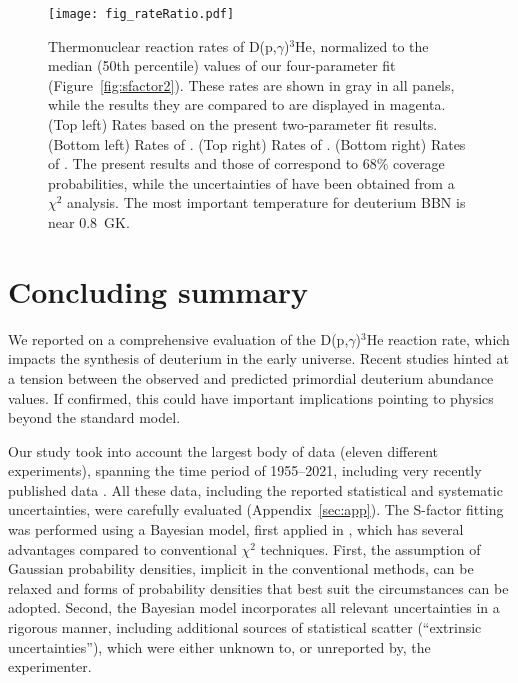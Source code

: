 \documentclass[twocolumn]{aastex63}
\begin{document}
%
\begin{figure*}
\texttt{[image: fig\_rateRatio.pdf]}
\caption{Thermonuclear reaction rates of D(p,$\gamma$)$^3$He, normalized to the median (50th percentile) values of our four-parameter fit (Figure~\ref{fig:sfactor2}). These rates are shown in gray in all panels, while the results they are compared to are displayed in magenta. (Top left) Rates based on the present two-parameter fit results. (Bottom left) Rates of \citet{iliadis16}. (Top right) Rates of \citet{Mossa20}. (Bottom right) Rates of \citet{Pis21}. The present results and those of \citet{iliadis16} correspond to 68\% coverage probabilities, while the uncertainties of \citet{Mossa20,Pis21} have been obtained from a $\chi^2$ analysis. The most important temperature for deuterium BBN is near 0.8~GK.}
\label{fig:rates}
\end{figure*}


\section{Concluding summary} 
\label{sec:summary}
We reported on a comprehensive evaluation of the D(p,$\gamma$)$^3$He reaction rate, which impacts the synthesis of deuterium in the early universe. Recent studies \citep{Coc15,Pitrou2018,IC20} hinted at a tension between the observed and predicted primordial deuterium abundance values. If confirmed, this could have important implications pointing to physics beyond the standard model.

Our study took into account the largest body of data (eleven different experiments), spanning the time period of 1955--2021, including very recently published data \citep{Tisma:2019ug,Mossa20,Turkat21}. All these data, including the reported statistical and systematic uncertainties, were carefully evaluated (Appendix~\ref{sec:app}). The S-factor fitting was performed using a Bayesian model, first applied in \citet{iliadis16}, which has several advantages compared to conventional $\chi^2$ techniques. First, the assumption of Gaussian probability densities, implicit in the conventional methods, can be relaxed and forms of probability densities that best suit the circumstances can be adopted. Second, the Bayesian model incorporates all relevant uncertainties in a rigorous manner, including additional sources of statistical scatter (``extrinsic uncertainties''), which were either unknown to, or unreported by, the experimenter.
\end{document}
